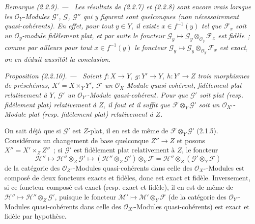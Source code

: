 \documentclass[10pt,oneside]{book}
\newcommand{\oldpage}[2][]{%
  \setcounter{footnote}{0}%
  \marginpar{\scriptsize\textbf{#1}~|~#2}\ignorespaces}
\newenvironment{proposition}[1][]{%
  \par\medskip\noindent\itshape Proposition (#1). ---\ }{\par}
\newenvironment{remark}[1][]{%
  \par\medskip\noindent\itshape Remarque (#1). ---\ }{\par}
\begin{document}
\begin{remark}[2.2.9]
\label{IV.2.2.9-fr}
Les résultats de (2.2.7) et (2.2.8) sont encore vrais lorsque les
$\mathcal O_Y$-Modules $\mathscr G'$, $\mathscr G$, $\mathscr G''$ qui y
figurent sont quelconques (non nécessairement quasi-cohérents). En effet,
pour tout $y\in Y$, il existe $x\in f^{-1}(y)$ tel que $\mathscr F_x$ soit un
$\mathcal O_y$-module
\oldpage[IV-2]{12}
fidèlement plat, et par suite le foncteur
$\mathscr G_y\mapsto\mathscr G_y\otimes_{\mathcal O_y}\mathscr F_x$ est
fidèle~; comme par ailleurs pour \emph{tout} $x\in f^{-1}(y)$ le foncteur
$\mathscr G_y\mapsto\mathscr G_y\otimes_{\mathcal O_y}\mathscr F_x$ est
exact, on en déduit aussitôt la conclusion.
\end{remark}

\begin{proposition}[2.2.10]
\label{IV.2.2.10-fr}
Soient $f:X\to Y$, $g:Y'\to Y$, $h:Y'\to Z$ trois morphismes de préschémas,
$X'=X\times_Y Y'$, $\mathscr F$ un $\mathcal O_X$-Module quasi-cohérent,
fidèlement plat relativement à $Y$, $\mathscr G'$ un
$\mathcal O_{Y'}$-Module quasi-cohérent. Pour que $\mathscr G'$ soit plat
(resp. fidèlement plat) relativement à $Z$, il faut et il suffit que
$\mathscr F\otimes_Y\mathscr G'$ soit un $\mathcal O_{X'}$-Module plat
(resp. fidèlement plat) relativement à $Z$.
\end{proposition}

On sait déjà que si $\mathscr G'$ est $Z$-plat, il en est de même de
$\mathscr F\otimes_Y\mathscr G'$ (2.1.5). Considérons un changement de base
quelconque $Z''\to Z$ et posons $X''=X'\times_Z Z''$~; si $\mathscr G'$ est
fidèlement plat relativement à $Z$, le foncteur
\begin{equation}
\tag{2.2.10.1}
\label{IV.2.2.10.1-fr}
\mathscr H''\mapsto\mathscr H''\otimes_Z\mathscr G'
\mapsto(\mathscr H''\otimes_Z\mathscr G')\otimes_Y\mathscr F
=\mathscr H''\otimes_Z(\mathscr G'\otimes_Y\mathscr F)
\end{equation}
de la catégorie des $\mathcal O_{Z''}$-Modules quasi-cohérents dans celle des
$\mathcal O_{X''}$-Modules est composé de deux foncteurs exacts et fidèles,
donc est exact et fidèle. Inversement, si ce foncteur composé est exact (resp.
exact et fidèle), il en est de même de
$\mathscr H''\mapsto\mathscr H''\otimes_Z\mathscr G'$, puisque le foncteur
$\mathscr M'\mapsto\mathscr M'\otimes_Y\mathscr F$ (de la catégorie des
$\mathcal O_{Y'}$-Modules quasi-cohérents dans celle des
$\mathcal O_{X'}$-Modules quasi-cohérents) est exact et fidèle par hypothèse.
\end{document}
